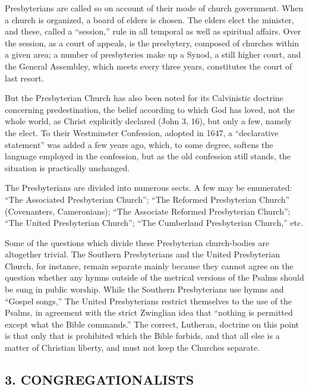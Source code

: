 \documentclass[
]{book}
\begin{document}
Presbyterians are called so on account of their mode of church government. When a church is organized, a board of elders is chosen. The elders elect the minister, and these, called a ``session,'' rule in all temporal as well as spiritual affairs. Over the session, as a court of appeals, is the presbytery, composed of churches within a given area; a number of presbyteries make up a Synod, a still higher court, and the General Assembley, which meets every three years, constitutes the court of last resort.

But the Presbyterian Church has also been noted for its Calvinistic doctrine concerning predestination, the belief according to which God has loved, not the whole world, as Christ explicitly declared (John 3, 16), but only a few, namely the elect. To their Westminster Confession, adopted in 1647, a ``declarative statement'' was added a few years ago, which, to some degree, softens the language employed in the confession, but as the old confession still stands, the situation is practically unchanged.

The Presbyterians are divided into numerous sects. A few may be enumerated: ``The Associated Presbyterian Church''; ``The Reformed Presbyterian Church'' (Covenanters, Cameronians); ``The Associate Reformed Presbyterian Church''; ``The United Presbyterian Church''; ``The Cumberland Presbyterian Church,'' etc.

Some of the questions which divide these Presbyterian church-bodies are altogether trivial. The Southern Presbyterians and the United Presbyterian Church, for instance, remain separate mainly because they cannot agree on the question whether any hymns outside of the metrical versions of the Psalms should be sung in public worship. While the Southern Presbyterians use hymns and ``Gospel songs,'' The United Presbyterians restrict themselves to the use of the Psalms, in agreement with the strict Zwinglian idea that ``nothing is permitted except what the Bible commands.'' The correct, Lutheran, doctrine on this point is that only that is prohibited which the Bible forbids, and that all else is a matter of Christian liberty, and must not keep the Churches separate.

\hypertarget{congregationalists}{%
\subsection*{\texorpdfstring{3. CONGREGATIONALISTS}{3. CONGREGATIONALISTS}}\label{congregationalists}}
\end{document}
